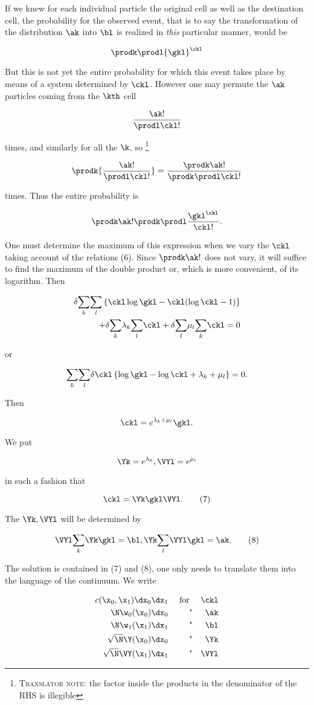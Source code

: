 \documentclass{article}
\newcommand{\nequ}[2]{
\begin{equation*}
#1
\tag{#2}
\end{equation*}
}
\newcommand{\uequ}[1]{
\begin{equation*}
#1
\end{equation*}
}
\newcommand{\TN}[1]{
\footnote{\sc{Translator note}: #1}
}
\newcommand{\var}[1]{#1}
\newcommand{\const}[1]{#1}
\renewcommand{\it}[1]{\textit{#1}}
\renewcommand{\sc}[1]{\textsc{#1}}
\newcommand{\sumk}{\underset{k}{\sum}}
\newcommand{\suml}{\underset{l}{\sum}}
\renewcommand{\exp}[1]{\const{e}^{#1}}
\begin{document}
If we knew for each individual particle the original cell as well as the destination cell, the probability for the observed event, that is to say the transformation of the distribution $\ak$ into $\bl$ is realized in \it{this} particular manner, would be\sic
\uequ{
\prodk\prodl{\gkl}^{\ckl}
}

But this is not yet the entire probability for which this event takes place by means of a system determined by $\ckl$. However one may permute the $\ak$ particles coming from the $\kth$ cell
\uequ{
\frac{\ak!}{\prodl\ckl!}
}
times, and similarly for all the $\k$, so\TN{the factor inside the products in the denominator of the RHS is illegible}
\uequ{
\prodk{\frac{\ak!}{\prodl\ckl!}} = \frac{\prodk\ak!}{\prodk\prodl\ckl!}
}
times. Thus the entire probability is
\uequ{
\prodk\ak!\prodk\prodl\frac{{\gkl}^{\ckl}}{\ckl!}.
}
One must determine the maximum of this expression when we vary the $\ckl$ taking account of the relations (6). Since $\prodk\ak!$ does not vary, it will suffice to find the maximum of the double product or, which is more convenient, of its logarithm. Then
\uequ{
\begin{split}
\delta\sumk\suml\left\{\ckl\log\gkl - \ckl(\log\ckl - 1)
\right\} \\
 + \delta\sumk\lambda_k\suml\ckl
 + \delta\suml\mu_l\sumk\ckl = 0
\end{split}
}
or
\uequ{
\sumk\suml\delta\ckl\left\{
\log\gkl - \log\ckl + \lambda_k + \mu_l
\right\} = 0.
}
Then
\uequ{
\ckl = \exp{\lambda_k + \mu_l}\gkl.
}
We put
\uequ{
\Yk = \exp{\lambda_k}, \VYl = \exp{\mu_l}
}
in such a fashion that
\nequ{
\ckl = \Yk\gkl\VYl.
}{7}

The $\Yk, \VYl$ will be determined by
\nequ{
\VYl\sumk\Yk\gkl = \bl, \Yk\suml\VYl\gkl = \ak.
}{8}

The solution is contained in (7) and (8), one only needs to translate them into the language of the continuum. We write

\begin{align*}
\var{c}(\x_0, \x_1)\dx_0\dx_1 & &\text{ for } & &\ckl \\
\N\w_0(\x_0)\dx_0             & &\text{"}     & &\ak \\
\N\w_1(\x_1)\dx_1             & &\text{"}     & &\bl \\
\sqrt{\N}\Y(\x_0)\dx_0        & &\text{"}     & &\Yk \\
\sqrt{\N}\VY(\x_1)\dx_1       & &\text{"}     & &\VYl \\
\end{align*}
\end{document}

